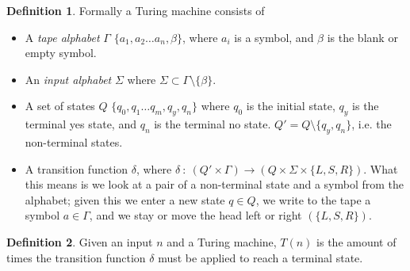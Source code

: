 \documentclass{article}
\theoremstyle{definition}
\newtheorem{definition}{Definition}[section]
\begin{document}
\begin{center}
\end{center}

\begin{definition}
	Formally a Turing machine consists of
	\begin{itemize}
		\item A \textit{tape alphabet} $\Gamma$ $\{a_1, a_2 \dots a_n, \beta\}$,
			where $a_i$ is a symbol, and $\beta$ is the blank or empty symbol.
		\item An \textit{input alphabet} $\Sigma$
			where $\Sigma \subset \Gamma \setminus \{\beta\}$.
		\item A set of states $Q$ $\{q_0, q_1 \dots q_m, q_y, q_n\}$ where $q_0$ is the
			initial state, $q_y$ is the terminal yes state, and $q_n$ is the terminal no state.
			$Q\prime = Q \setminus \{q_y,q_n\}$, i.e. the non-terminal states.
		\item A transition function $\delta$,
			where $\delta\ :\ (Q\prime \times \Gamma) \rightarrow
			(Q \times \Sigma \times \{L,S,R\})$.
			What this means is we look at a pair of a non-terminal state
			and a symbol from the alphabet;
			given this we enter a new state $q \in Q$,
			we write to the tape a symbol $a \in \Gamma$,
			and we stay or move the head left or right $(\{L,S,R\})$.
	\end{itemize}
\end{definition}

\begin{definition}
	Given an input $n$ and a Turing machine,
	$T(n)$ is the amount of times the transition function 
	$\delta$ must be applied to reach a terminal state.
\end{definition}
\end{document}
